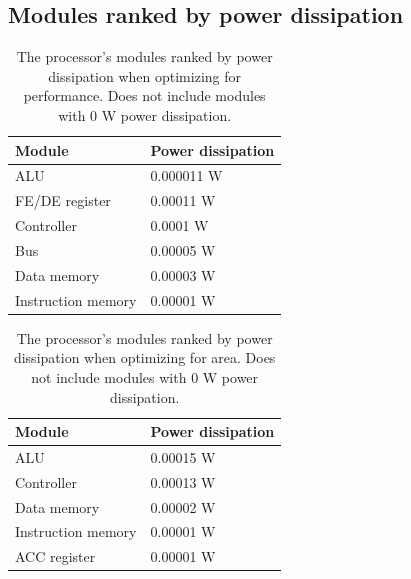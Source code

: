 \documentclass[a4paper,11pt]{article}
\begin{document}
\begin{appendix}
\begin{table}[h!]
\caption{Results obtained when optimizing for efficiency.}
\label{tab:eff_res}
\end{table}

\newpage
\subsection{Modules ranked by power dissipation}

\begin{table}[h!]
\centering
\begin{tabular}{|l|l|} \hline
  \textbf{Module} & \textbf{Power dissipation}\\ \hline
  ALU & 0.000011 W \\
  FE/DE register & 0.00011 W \\
  Controller & 0.0001 W \\
  Bus & 0.00005 W \\
  Data memory & 0.00003 W \\
  Instruction memory & 0.00001 W\\ \hline
\end{tabular}
\caption{The processor's modules ranked by power dissipation when optimizing for performance. Does not include modules with 0 W power dissipation.}
\label{tab:power_rank_perf}
\end{table}

\begin{table}[h!]
\centering
\begin{tabular}{|l|l|} \hline
  \textbf{Module} & \textbf{Power dissipation}\\ \hline
  ALU & 0.00015 W \\
  Controller & 0.00013 W \\
  Data memory & 0.00002 W \\ 
  Instruction memory & 0.00001 W \\
  ACC register & 0.00001 W \\ \hline
\end{tabular}
\caption{The processor's modules ranked by power dissipation when optimizing for area. Does not include modules with 0 W power dissipation.}
\label{tab:power_rank_area}
\end{table}


\end{appendix}
\end{document}
